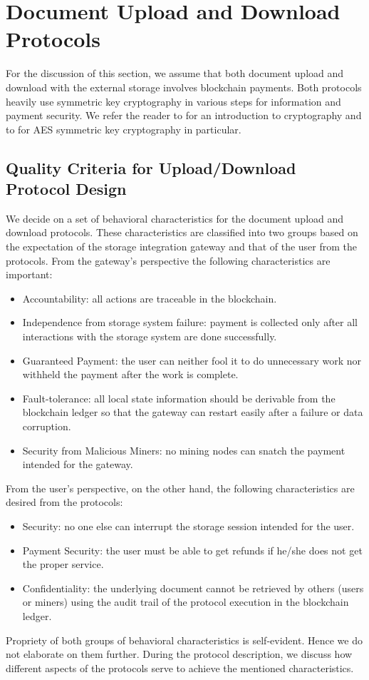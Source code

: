 \section{Document Upload and Download Protocols}
\label{s-updown}
For the discussion of this section, we assume that both document upload and download with the external storage involves blockchain payments. Both protocols heavily use symmetric key cryptography in various steps for information and payment security. We refer the reader to \cite{1455525} for an introduction to cryptography and to \cite{Daemen99aesproposal:} for AES symmetric key cryptography in particular.

\subsection{Quality Criteria for Upload/Download Protocol Design}
We decide on a set of behavioral characteristics for the document upload and download protocols. These characteristics are classified into two groups based on the expectation of the storage integration gateway and that of the user from the protocols. 
From the gateway's perspective the following characteristics are important:
\begin{itemize}
\item Accountability: all actions are traceable in the blockchain.
\item Independence from storage system failure: payment is collected only after all interactions with the storage system are done successfully.
\item Guaranteed Payment: the user can neither fool it to do unnecessary work nor withheld the payment after the work is complete.
\item Fault-tolerance: all local state information should be derivable from the blockchain ledger so that the gateway can restart easily after a failure or data corruption.  
\item Security from Malicious Miners: no mining nodes can snatch the payment intended for the gateway. 
\end{itemize}   
From the user's perspective, on the other hand, the following characteristics are desired from the protocols:
\begin{itemize}
\item Security: no one else can interrupt the storage session intended for the user. 
\item Payment Security: the user must be able to get refunds if he/she does not get the proper service. 
\item Confidentiality: the underlying document cannot be retrieved by others (users or miners) using the audit trail of the protocol execution in the blockchain ledger.
\end{itemize} 
Propriety of both groups of behavioral characteristics is self-evident. Hence we do not elaborate on them further. During the protocol description, we discuss how different aspects of the protocols serve to achieve the mentioned characteristics. 


